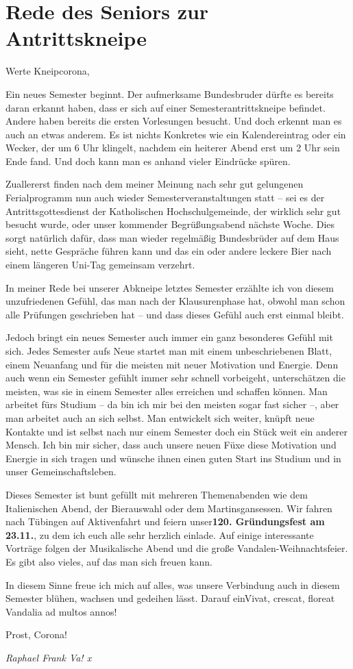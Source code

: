 \section{Rede des Seniors zur Antrittskneipe}
Werte Kneipcorona,
\begin{multicols}{2}

Ein neues
Semester beginnt. Der aufmerksame Bundesbruder dürfte es bereits daran erkannt
haben, dass er sich auf einer Semesterantrittskneipe befindet. Andere haben
bereits die ersten Vorlesungen besucht. Und doch erkennt man es auch an etwas
anderem. Es ist nichts Konkretes wie ein Kalendereintrag oder ein Wecker, der
um 6 Uhr klingelt, nachdem ein heiterer Abend erst um 2 Uhr sein Ende fand. Und
doch kann man es anhand vieler Eindrücke spüren.

Zuallererst
finden nach dem meiner Meinung nach sehr gut gelungenen Ferialprogramm nun auch
wieder Semesterveranstaltungen statt – sei es der Antrittsgottesdienst der
Katholischen Hochschulgemeinde, der wirklich sehr gut besucht wurde, oder unser
kommender Begrüßungsabend nächste Woche. Dies sorgt natürlich dafür, dass man
wieder regelmäßig Bundesbrüder auf dem Haus sieht, nette Gespräche führen kann
und das ein oder andere leckere Bier nach einem längeren Uni-Tag gemeinsam
verzehrt.

In meiner
Rede bei unserer Abkneipe letztes Semester erzählte ich von diesem
unzufriedenen Gefühl, das man nach der Klausurenphase hat, obwohl man schon
alle Prüfungen geschrieben hat – und dass dieses Gefühl auch erst einmal
bleibt.

Jedoch bringt ein neues Semester auch immer ein ganz besonderes Gefühl mit sich. Jedes
Semester aufs Neue startet man mit einem unbeschriebenen Blatt, einem Neuanfang
und für die meisten mit neuer Motivation und Energie. Denn auch wenn ein
Semester gefühlt immer sehr schnell vorbeigeht, unterschätzen die meisten, was
sie in einem Semester alles erreichen und schaffen können. Man arbeitet fürs
Studium – da bin ich mir bei den meisten sogar fast sicher –, aber man arbeitet
auch an sich selbst. Man entwickelt sich weiter, knüpft neue Kontakte und ist
selbst nach nur einem Semester doch ein Stück weit ein anderer Mensch. Ich bin
mir sicher, dass auch unsere neuen Füxe diese Motivation und Energie in sich
tragen und wünsche ihnen einen guten Start ins Studium und in unser
Gemeinschaftsleben.

Dieses Semester ist bunt gefüllt mit mehreren Themenabenden wie dem Italienischen
Abend, der Bierauswahl oder dem Martinsgansessen. Wir fahren nach Tübingen auf
Aktivenfahrt und feiern unser\textbf{120. Gründungsfest am 23.11.}, zu dem
ich euch alle sehr herzlich einlade. Auf einige interessante Vorträge folgen
der Musikalische Abend und die große Vandalen-Weihnachtsfeier. Es gibt also
vieles, auf das man sich freuen kann.

In diesem
Sinne freue ich mich auf alles, was unsere Verbindung auch in diesem Semester
blühen, wachsen und gedeihen lässt. Darauf einVivat, crescat,
floreat Vandalia ad multos annos!

Prost, Corona!

	\begin{flushright}
		\hfill\emph{Raphael Frank Va! x}
	\end{flushright}
\end{multicols}


